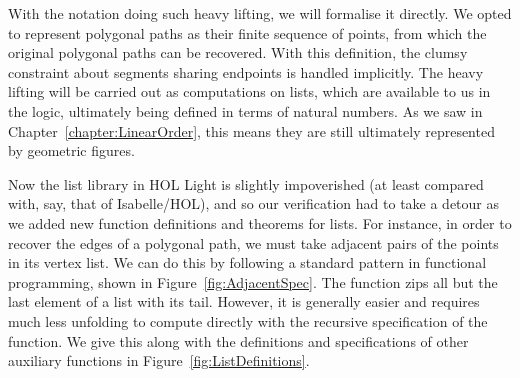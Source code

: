 


With the notation doing such heavy lifting, we will formalise it directly. We opted to represent polygonal paths as their finite sequence of points, from which the original polygonal paths can be recovered. With this definition, the clumsy constraint about segments sharing endpoints is handled implicitly. The heavy lifting will be carried out as computations on lists, which are available to us in the logic, ultimately being defined in terms of natural numbers. As we saw in Chapter~\ref{chapter:LinearOrder}, this means they are still ultimately represented by geometric figures. 


Now the list library in HOL Light is slightly impoverished (at least compared with, say, that of Isabelle/HOL), and so our verification had to take a detour as we added new function definitions and theorems for lists. For instance, in order to recover the edges of a polygonal path, we must take adjacent pairs of the points in its vertex list. We can do this by following a standard pattern in functional programming, shown in Figure~\ref{fig:AdjacentSpec}. The function  zips all but the last element of a list with its tail. However, it is generally easier and requires much less unfolding to compute directly with the recursive specification of the function. We give this along with the definitions and specifications of other auxiliary functions in Figure~\ref{fig:ListDefinitions}.


